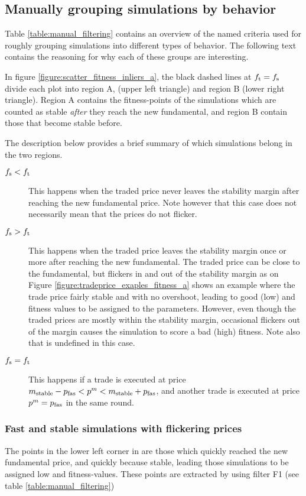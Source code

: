 \subsection{Manually grouping simulations by behavior}\label{section:manually_grouping_simulations}
Table \ref{table:manual_filtering} contains an overview of the named criteria used for roughly grouping simulations into different types of behavior. The following text contains the reasoning for why each of these groups are interesting.

In figure \ref{figure:scatter_fitness_inliers_a}, the black dashed lines at $f_\text{t} = f_\text{s}$ divide each plot into region A, (upper left triangle) and region B (lower right triangle). Region A contains the fitness-points of the simulations which are counted as stable \textit{after} they reach the new fundamental, and region B contain those that become stable before. 

The description below provides a brief summary of which simulations belong in the two regions.
\begin{description}
\item[$f_\text{s} < f_\text{t}$] This happens when the traded price never leaves the stability margin after reaching the new fundamental price. Note however that this case does not necessarily mean that the prices do not flicker. 
\item[$f_\text{s} > f_\text{t}$] This happens when the traded price leaves the stability margin once or more after reaching the new fundamental. The traded price can be close to the fundamental, but flickers in and out of the stability margin as on Figure \ref{figure:tradeprice_exaples_fitness_a} shows an example where the trade price fairly stable and with no overshoot, leading to good (low) \stdev and \overshoot fitness values to be assigned to the parameters. However, even though the traded prices are mostly within the stability margin, occasional flickers out of the margin causes the simulation to score a bad (high) \roundstable fitness. Note also that \timetoreachnewfundamental is undefined in this case. 
\item[$f_\text{s} = f_\text{t}$] This happens if a trade is executed at price $m_\text{stable} - p_\text{fas} < p^m < m_\text{stable} + p_\text{fas}$, and another trade is executed at price $p^m = p_\text{fas}$ in the same round. 
\end{description}


\subsubsection*{Fast and stable simulations with flickering prices}
The points in the lower left corner in are those which quickly reached the new fundamental price, and quickly because stable, leading those simulations to be assigned low \timetoreachnewfundamental and \roundstable fitness-values. These points are extracted by using filter F1 (see table \ref{table:manual_filtering})


